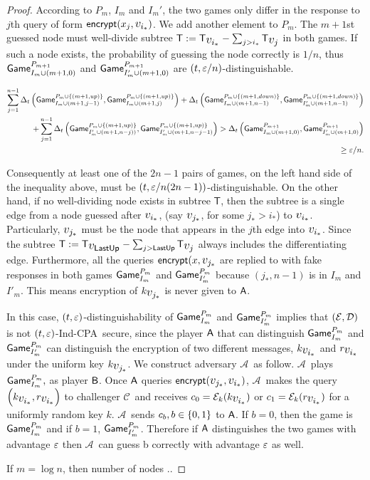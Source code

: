 \documentclass{article}
\newcommand{\tcpa}{$(t,\eps)$-Ind-CPA}
\def\B{{\sf B}}
\def\A{{\sf A}}
\def\E{{\cal E}}
\def\D{{\cal D}}
\def\a {${\mathcal A}$}
\def\ch {${\mathcal C}$}
\newcommand{\encrypt}{{\sf encrypt}}
\newcommand{\game}{{\sf Game}}
\newcommand{\T}{{\mathsf T}}
\newcommand{\dgg}[2]{\game_{#1}^{#2}}
\newcommand{\lastup}{{\mathsf {LastUp}}}
\newcommand{\bigv}[1]{\mbox{\large $v_{#1}$}}
\begin{document}
\begin{proof}
According to $P_m$, $I_m$ and $I_m'$, the two games only differ in the response to $j$th query of form $\encrypt(x_j,\bigv{i_*})$. We add another element to $P_{m}$. The $m+1$st guessed node must well-divide subtree $\T:=\T_{\bigv{i_*}}-\sum_{ j>i_*} \T_{\bigv{j}}$ in both games. If such a node exists, the probability of guessing the node correctly is $1/n$, thus $\dgg{I_m\cup (m+1,0)}{P_{m+1}}$ and $\dgg{I'_m\cup (m+1,0) }{P_{m+1}}$ are $(t,\varepsilon/n)$-distinguishable.


\begin{align*}
\sum_{j=1}^{n-1} \dElta{\dgg{I_m\cup (m+1,j-1)}{P_m\cup \cub{(m+1, up)}},\dgg{I_m\cup (m+1,j)}{P_m\cup \cub{(m+1, up)}}}+ \dElta{\dgg{I_m\cup (m+1,n-1)}{P_m\cup \cub{(m+1, down)}},\dgg{I'_m\cup (m+1,n-1)}{P_m\cup \cub{(m+1, down)}}} \\+ \sum_{j=1}^{n-1} \dElta{\dgg{I'_m\cup (m+1,n-j))}{P_m\cup \cub{(m+1, up)}},\dgg{I'_m\cup (m+1,n-j-1)}{P_m\cup \cub{(m+1, up)}}}
> \dElta{\dgg{I_m\cup (m+1,0)}{P_{m+1}},\dgg{I'_m\cup (m+1,0) }{P_{m+1}}}\\ \geq \eps/n.
\end{align*}

Consequently at least one of the $2n-1$ pairs of games, on the left hand side of the inequality above, must be $(t,\varepsilon/n(2n-1))$-distinguishable. On the other hand, if no well-dividing node exists in subtree $\T$, then the subtree is a single edge from a node guessed after $\bigv{i_*}$, (say $\bigv{j_*}$, for some $j_*>i_*$) to $\bigv{i_*}$. Particularly, $\bigv{j_*}$ must be the node that appears in the $j$th edge into $\bigv{i_*}$. Since the subtree $\T:=\T_{\bigv{\lastup}}-\sum_{ j>\lastup} \T_{\bigv{j}}$ always includes the differentiating edge. Furthermore, all the queries $\encrypt(x,\bigv{j_*}$ are replied to with fake responses in both games $\dgg{I_m}{P_m}$ and $\dgg{I'_m}{P_m}$ because $(j_*,n-1)$ is in $I_m$ and $I'_m$. This means encryption of $k_{\bigv{j_*}}$ is never given to $\A$. 

In this case, $(t,\varepsilon)$-distinguishability of $\dgg{I_m}{P_m}$ and $\dgg{I'_m}{P_m}$ implies that $(\E,\D)$ is not \tcpa~secure, since the player $\A$ that can distinguish $\dgg{I_m}{P_m}$ and $\dgg{I'_m}{P_m}$ can distinguish the encryption of two different messages, $k_{\bigv{i_*}}$ and $r_{\bigv{i_*}}$ under the uniform key $k_{\bigv{j_*}}$. 
We construct adversary \a~as follow. \a~plays $\dgg{I_m}{P_m},$ as player $\B$. Once $\A$ queries $\encrypt(\bigv{j_*},\bigv{i_*})$, \a~makes the query $\rob{k_{\bigv{i_*}},r_{\bigv{i_*}}}$ to challenger \ch~and receives $c_0= \E_k(k_{\bigv{i_*}})$ or $c_1= \E_k(r_{\bigv{i_*}})$ for a uniformly random key $k$. \a~sends $c_b, b\in\{0,1\}$ to $\A$. If $b=0$, then the game is $\dgg{I_m}{P_m}$ and if $b=1$, $\dgg{I'_m}{P_m}$. Therefore if $\A$ distinguishes the two games with advantage $\varepsilon$ then \a~can guess b correctly with advantage $\varepsilon$ as well.

If $m=\log n$, then number of nodes ..
\end{proof}
\end{document}
